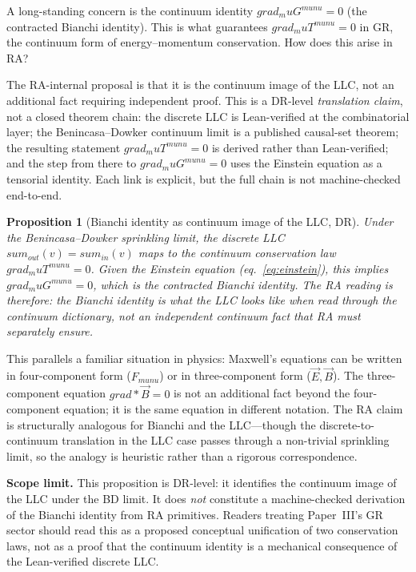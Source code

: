 \documentclass[11pt]{article}
\def\mu{mu}%
\def\nu{nu}%
\def\mathrm#1{#1}%
\def\cdot{*}%
\def\sum{sum}%
\def\nabla{grad}%
\newtheorem{proposition}{Proposition}
\begin{document}
A long-standing concern is the continuum identity $\nabla_\mu G^{\mu\nu} = 0$ (the contracted Bianchi identity). This is what guarantees $\nabla_\mu T^{\mu\nu} = 0$ in GR, the continuum form of energy--momentum conservation. How does this arise in RA?

The RA-internal proposal is that it is the continuum image of the LLC, not an additional fact requiring independent proof. This is a DR-level \emph{translation claim}, not a closed theorem chain: the discrete LLC is Lean-verified at the combinatorial layer; the Benincasa--Dowker continuum limit is a published causal-set theorem; the resulting statement $\nabla_\mu T^{\mu\nu} = 0$ is derived rather than Lean-verified; and the step from there to $\nabla_\mu G^{\mu\nu} = 0$ uses the Einstein equation as a tensorial identity. Each link is explicit, but the full chain is not machine-checked end-to-end.

\begin{proposition}[Bianchi identity as continuum image of the LLC, DR]
\label{prop:bianchi_llc}
Under the Benincasa--Dowker sprinkling limit, the discrete LLC $\sum_{\mathrm{out}}(v) = \sum_{\mathrm{in}}(v)$ maps to the continuum conservation law $\nabla_\mu T^{\mu\nu} = 0$. Given the Einstein equation (eq.~\ref{eq:einstein}), this implies $\nabla_\mu G^{\mu\nu} = 0$, which is the contracted Bianchi identity. The RA reading is therefore: the Bianchi identity is what the LLC looks like when read through the continuum dictionary, not an independent continuum fact that RA must separately ensure.
\end{proposition}

This parallels a familiar situation in physics: Maxwell's equations can be written in four-component form ($F_{\mu\nu}$) or in three-component form ($\vec{E}, \vec{B}$). The three-component equation $\nabla \cdot \vec{B} = 0$ is not an additional fact beyond the four-component equation; it is the same equation in different notation. The RA claim is structurally analogous for Bianchi and the LLC---though the discrete-to-continuum translation in the LLC case passes through a non-trivial sprinkling limit, so the analogy is heuristic rather than a rigorous correspondence.

\textbf{Scope limit.} This proposition is DR-level: it identifies the continuum image of the LLC under the BD limit. It does \emph{not} constitute a machine-checked derivation of the Bianchi identity from RA primitives. Readers treating Paper~III's GR sector should read this as a proposed conceptual unification of two conservation laws, not as a proof that the continuum identity is a mechanical consequence of the Lean-verified discrete LLC.
\end{document}

